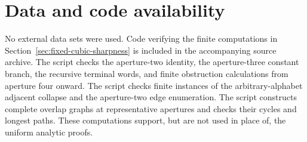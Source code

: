 \section*{Data and code availability}

No external data sets were used.  Code verifying the finite computations in
Section~\ref{sec:fixed-cubic-sharpness} is included in the accompanying
source archive.  The script
 checks the aperture-two
identity, the aperture-three constant branch, the recursive terminal words,
and finite obstruction calculations from aperture four onward.  The script
 checks finite instances of
the arbitrary-alphabet adjacent collapse and the aperture-two edge
enumeration.  The script
 constructs complete
overlap graphs at representative apertures and checks their cycles and
longest paths.  These computations support, but are not used in place of,
the uniform analytic proofs.
